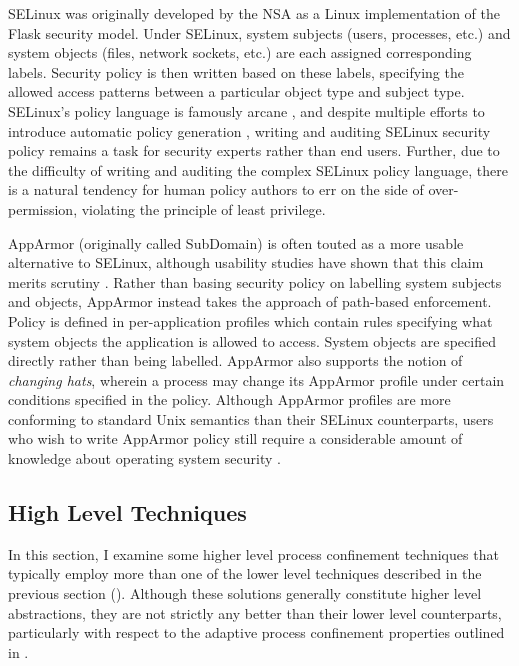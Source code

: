 \documentclass[dvipsnames, 12pt]{article}
\begin{document}
SELinux \cite{smalley2001_selinux} was originally developed by the NSA as
a Linux implementation of the Flask \cite{spencer1999_flask} security model.
Under SELinux, system subjects (users, processes, etc.) and system objects
(files, network sockets, etc.) are each assigned corresponding labels. Security
policy is then written based on these labels, specifying the allowed access
patterns between a particular object type and subject type. SELinux's policy
language is famously arcane \cite{schreuders12_towards}, and despite multiple
efforts to introduce automatic policy generation \cite{audit2allow,
macmillan07_madison, macmillan07_madison}, writing and auditing SELinux security
policy remains a task for security experts rather than end users. Further, due
to the difficulty of writing and auditing the complex SELinux policy language,
there is a natural tendency for human policy authors to err on the side of
over-permission, violating the principle of least privilege.

AppArmor (originally called SubDomain) \cite{cowan2000_apparmor} is often touted
as a more usable alternative to SELinux, although usability studies have shown
that this claim merits scrutiny \cite{schreuders12_towards}. Rather than basing
security policy on labelling system subjects and objects, AppArmor instead takes
the approach of path-based enforcement. Policy is defined in per-application
profiles which contain rules specifying what system objects the application is
allowed to access. System objects are specified directly rather than being
labelled.  AppArmor also supports the notion of \textit{changing hats}, wherein
a process may change its AppArmor profile under certain conditions specified in
the policy.  Although AppArmor profiles are more conforming to standard Unix
semantics than their SELinux counterparts, users who wish to write AppArmor
policy still require a considerable amount of knowledge about operating system
security \cite{schreuders12_towards}.


\subsection{High Level Techniques}
\label{sec:high-level}

In this section, I examine some higher level process confinement techniques that
typically employ more than one of the lower level techniques described in the
previous section (). Although these solutions generally
constitute higher level abstractions, they are not strictly any better than
their lower level counterparts, particularly with respect to the adaptive
process confinement properties outlined in .
\end{document}
